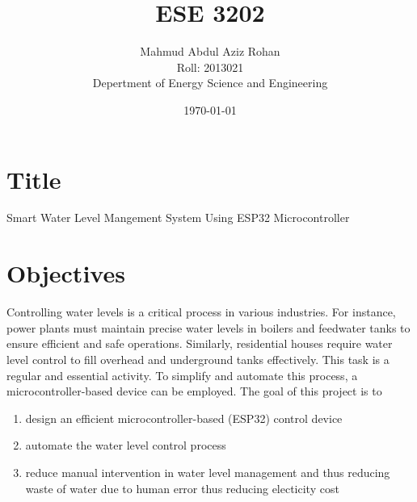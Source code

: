 \documentclass{article}
\title{ESE 3202}
\author{Mahmud Abdul Aziz Rohan \\ Roll: 2013021 \\ Depertment of Energy Science
and Engineering}
\date{\today}
\theoremstyle{mytheoremstyle}
\theoremstyle{mytheoremstyle}
\theoremstyle{myproblemstyle}
\begin{document}
  \maketitle
    
  \section*{Title}
  Smart Water Level Mangement System Using ESP32 Microcontroller

  \section*{Objectives}
  Controlling water levels is a critical process in various industries. For 
  instance, power plants must maintain precise water levels in boilers and 
  feedwater tanks to ensure efficient and safe operations. Similarly,
  residential houses require water level control to fill overhead and
  underground tanks effectively. This task is a regular and essential activity.
  To simplify and automate this process, a microcontroller-based device can be 
  employed. The goal of this project is to

  \begin{enumerate}
    \item design an efficient microcontroller-based (ESP32) control device
    \item automate the water level control process
    \item reduce manual intervention in water level management and thus reducing
      waste of water due to human error thus reducing electicity cost
  \end{enumerate}

    
\end{document}
